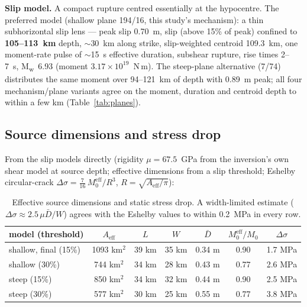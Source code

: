 \documentclass[11pt]{article}
\newcommand{\Mw}{M\textsubscript{w}}
\begin{document}
\textbf{Slip model.} A compact rupture centred essentially at the hypocentre. The preferred
model (shallow plane 194/16, this study's mechanism): a thin subhorizontal slip lens ---
peak slip 0.70~m, slip (above 15\% of peak) confined to \textbf{105--113~km} depth,
$\sim$30~km along strike, slip-weighted centroid 109.3~km, one moment-rate pulse of
$\sim$15~s effective duration, subshear rupture, rise times 2--7~s, \Mw~6.93 (moment
$3.17\times10^{19}$~N\,m). The steep-plane alternative (7/74) distributes the same moment
over 94--121~km of depth with 0.89~m peak; all four mechanism/plane variants agree on the
moment, duration and centroid depth to within a few km (Table~\ref{tab:planes}).

\subsection{Source dimensions and stress drop}
\label{sec:stressdrop}
From the slip models directly (rigidity $\mu = 67.5$~GPa from the inversion's own shear
model at source depth; effective dimensions from a slip threshold; Eshelby circular-crack
$\Delta\sigma = \frac{7}{16}\,M_0^{\mathrm{eff}}/R^3$, $R=\sqrt{A_{\mathrm{eff}}/\pi}$):
\begin{table}[H]\centering\footnotesize
\begin{tabular}{lcccccc}\toprule
model (threshold) & $A_{\mathrm{eff}}$ & $L$ & $W$ & $\bar{D}$ & $M_0^{\mathrm{eff}}/M_0$ & $\Delta\sigma$\\\midrule
shallow, final (15\%) & 1093 km$^2$ & 39 km & 35 km & 0.34 m & 0.90 & 1.7 MPa\\
shallow (30\%) & 744 km$^2$ & 34 km & 28 km & 0.43 m & 0.77 & 2.6 MPa\\
steep (15\%) & 850 km$^2$ & 34 km & 32 km & 0.44 m & 0.90 & 2.5 MPa\\
steep (30\%) & 577 km$^2$ & 30 km & 25 km & 0.55 m & 0.77 & 3.8 MPa\\\bottomrule
\end{tabular}
\caption{Effective source dimensions and static stress drop. A width-limited estimate
($\Delta\sigma \approx 2.5\,\mu\bar{D}/W$) agrees with the Eshelby values to within
0.2~MPa in every row.}
\label{tab:stress}
\end{table}
\end{document}
